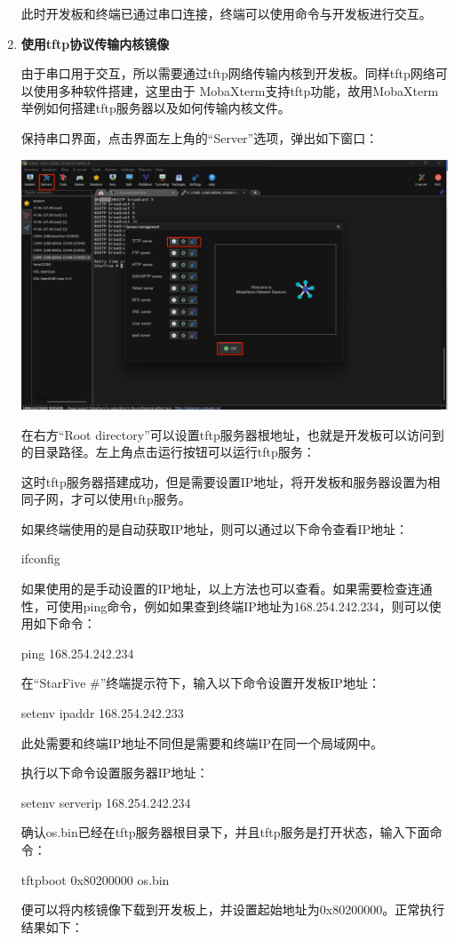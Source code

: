 \begin{enumerate}
	此时开发板和终端已通过串口连接，终端可以使用命令与开发板进行交互。
	
	\item \textbf{使用tftp协议传输内核镜像}
	
	由于串口用于交互，所以需要通过tftp网络传输内核到开发板。同样tftp网络可以使用多种软件搭建，这里由于
	MobaXterm支持tftp功能，故用MobaXterm举例如何搭建tftp服务器以及如何传输内核文件。
	
	保持串口界面，点击界面左上角的“Server”选项，弹出如下窗口：
	
	\centering
	\includegraphics[width=0.58\linewidth]{figures/08-02-tftp服务器搭建.jpg}
	\raggedright
	
	在右方“Root directory”可以设置tftp服务器根地址，也就是开发板可以访问到的目录路径。左上角点击运行按钮可以运行tftp服务：
	
	这时tftp服务器搭建成功，但是需要设置IP地址，将开发板和服务器设置为相同子网，才可以使用tftp服务。
	
	如果终端使用的是自动获取IP地址，则可以通过以下命令查看IP地址：
	
	ifconfig
	
	如果使用的是手动设置的IP地址，以上方法也可以查看。如果需要检查连通性，可使用ping命令，例如如果查到终端IP地址为168.254.242.234，则可以使用如下命令：
	
	ping 168.254.242.234
	
	在“StarFive \#”终端提示符下，输入以下命令设置开发板IP地址：
	
	setenv ipaddr 168.254.242.233
	
	此处需要和终端IP地址不同但是需要和终端IP在同一个局域网中。
	
	执行以下命令设置服务器IP地址：
	
	setenv serverip 168.254.242.234
	
	确认os.bin已经在tftp服务器根目录下，并且tftp服务是打开状态，输入下面命令：
	
	tftpboot 0x80200000 os.bin
	
	便可以将内核镜像下载到开发板上，并设置起始地址为0x80200000。正常执行结果如下：
	

\end{enumerate}
